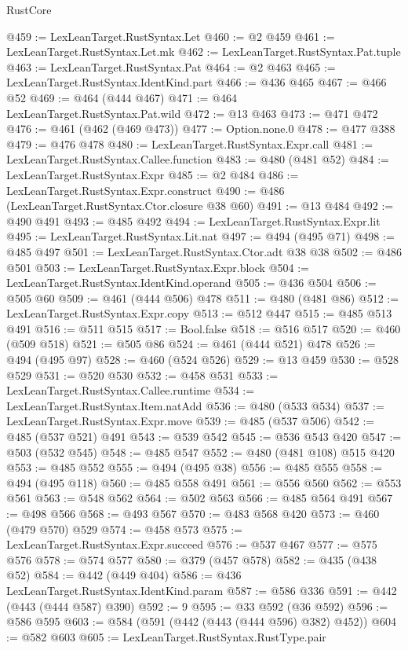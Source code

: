\begin{lexlean}{RustCore}
\begin{coremodule}
@459 := LexLeanTarget.RustSyntax.Let
@460 := @2 @459
@461 := LexLeanTarget.RustSyntax.Let.mk
@462 := LexLeanTarget.RustSyntax.Pat.tuple
@463 := LexLeanTarget.RustSyntax.Pat
@464 := @2 @463
@465 := LexLeanTarget.RustSyntax.IdentKind.part
@466 := @436 @465
@467 := @466 @52
@469 := @464 (@444 @467)
@471 := @464 LexLeanTarget.RustSyntax.Pat.wild
@472 := @13 @463
@473 := @471 @472
@476 := @461 (@462 (@469 @473))
@477 := Option.none.{0}
@478 := @477 @388
@479 := @476 @478
@480 := LexLeanTarget.RustSyntax.Expr.call
@481 := LexLeanTarget.RustSyntax.Callee.function
@483 := @480 (@481 @52)
@484 := LexLeanTarget.RustSyntax.Expr
@485 := @2 @484
@486 := LexLeanTarget.RustSyntax.Expr.construct
@490 := @486 (LexLeanTarget.RustSyntax.Ctor.closure @38 @60)
@491 := @13 @484
@492 := @490 @491
@493 := @485 @492
@494 := LexLeanTarget.RustSyntax.Expr.lit
@495 := LexLeanTarget.RustSyntax.Lit.nat
@497 := @494 (@495 @71)
@498 := @485 @497
@501 := LexLeanTarget.RustSyntax.Ctor.adt @38 @38
@502 := @486 @501
@503 := LexLeanTarget.RustSyntax.Expr.block
@504 := LexLeanTarget.RustSyntax.IdentKind.operand
@505 := @436 @504
@506 := @505 @60
@509 := @461 (@444 @506) @478
@511 := @480 (@481 @86)
@512 := LexLeanTarget.RustSyntax.Expr.copy
@513 := @512 @447
@515 := @485 @513 @491
@516 := @511 @515
@517 := Bool.false
@518 := @516 @517
@520 := @460 (@509 @518)
@521 := @505 @86
@524 := @461 (@444 @521) @478
@526 := @494 (@495 @97)
@528 := @460 (@524 @526)
@529 := @13 @459
@530 := @528 @529
@531 := @520 @530
@532 := @458 @531
@533 := LexLeanTarget.RustSyntax.Callee.runtime
@534 := LexLeanTarget.RustSyntax.Item.natAdd
@536 := @480 (@533 @534)
@537 := LexLeanTarget.RustSyntax.Expr.move
@539 := @485 (@537 @506)
@542 := @485 (@537 @521) @491
@543 := @539 @542
@545 := @536 @543 @420
@547 := @503 (@532 @545)
@548 := @485 @547
@552 := @480 (@481 @108) @515 @420
@553 := @485 @552
@555 := @494 (@495 @38)
@556 := @485 @555
@558 := @494 (@495 @118)
@560 := @485 @558 @491
@561 := @556 @560
@562 := @553 @561
@563 := @548 @562
@564 := @502 @563
@566 := @485 @564 @491
@567 := @498 @566
@568 := @493 @567
@570 := @483 @568 @420
@573 := @460 (@479 @570) @529
@574 := @458 @573
@575 := LexLeanTarget.RustSyntax.Expr.succeed
@576 := @537 @467
@577 := @575 @576
@578 := @574 @577
@580 := @379 (@457 @578)
@582 := @435 (@438 @52)
@584 := @442 (@449 @404)
@586 := @436 LexLeanTarget.RustSyntax.IdentKind.param
@587 := @586 @336
@591 := @442 (@443 (@444 @587) @390)
@592 := 9
@595 := @33 @592 (@36 @592)
@596 := @586 @595
@603 := @584 (@591 (@442 (@443 (@444 @596) @382) @452))
@604 := @582 @603
@605 := LexLeanTarget.RustSyntax.RustType.pair

\end{coremodule}
\end{lexlean}
